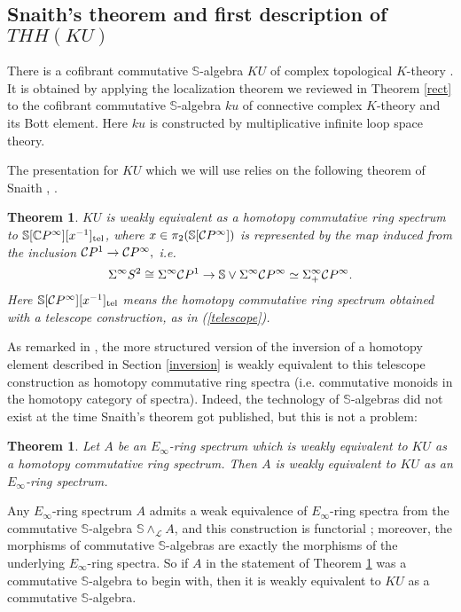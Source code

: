 \documentclass[a4paper,11pt]{amsart} %
\theoremstyle{definition} \newtheorem{defn}[equation]{Definition}
\theoremstyle{remark} \newtheorem{notation}[equation]{Notation}
\theoremstyle{plain} \newtheorem{teo}[equation]{Theorem}
\theoremstyle{plain} \newtheorem{lema}[equation]{Lemma}
\theoremstyle{plain} \newtheorem{prop}[equation]{Proposition}
\theoremstyle{plain} \newtheorem{corolario}[equation]{Corollary}
\theoremstyle{remark} \newtheorem{obs}[equation]{Remark}
\theoremstyle{remark} \newtheorem{sideobs}[equation]{Side remark}
\theoremstyle{remark} \newtheorem{ejercicio}[equation]{Exercise}
\theoremstyle{definition} \newtheorem{notn}[equation]{Notation}
\theoremstyle{remark} \newtheorem{ej}[equation]{Example}
\theoremstyle{remark} \newtheorem{contraej}[equation]{Counterexample}
\theoremstyle{plain} \newtheorem{conj}[equation]{Conjecture}
\renewcommand{\L}{\mathcal{L}}
\renewcommand{\1}{\ensuremath{\mathbbm{1}}}
\renewcommand{\S}{\mathbb{S}}
\newcommand{\bteo}{\begin{teo}}
\newcommand{\eteo}{\end{teo}}
\newcommand{\sip}{\Sigma^\infty_+}
\numberwithin{equation}{section}
\renewcommand{\L}{\mathcal{L}}
\begin{document}
%
%
%
%
%
%
%
%



\subsection{Snaith's theorem and first description of $THH(KU)$} \label{construction-ku}  

There is a cofibrant commutative $\S$-algebra $KU$ of complex topological $K$-theory \cite[VIII.4.3]{ekmm}. It is obtained by applying the localization theorem we reviewed in Theorem \ref{rect} to the cofibrant commutative $\S$-algebra $ku$ of connective complex $K$-theory and its Bott element. Here $ku$ is constructed by multiplicative infinite loop space theory.

The presentation for $KU$ which we will use relies on the following theorem of Snaith \cite{snaith79}, \cite{snaith81}. %

\bteo $KU$ is weakly equivalent as a homotopy commutative ring spectrum to \linebreak $\S[\mathbb C P^\infty][x^{-1}]_{\textup{tel}}$, where $x\in \pi_2(\S[\C P^\infty])$ is represented by the map induced from the inclusion $\mathcal{C} P^1\to \mathcal{C} P^\infty,$ i.e.
\begin{equation}\label{xproj} \Sigma^\infty S^2\cong \Sigma^\infty \C P^1 \to \S \vee \Sigma^\infty \C P^\infty \simeq \sip \C P^\infty. \end{equation}
Here $\S[\C P^\infty][x^{-1}]_{\textup{tel}}$ means the homotopy commutative ring spectrum obtained with a telescope construction, as in (\ref{telescope}).
\eteo

As remarked in \cite[VIII.4]{ekmm}, the more structured version of the inversion of a homotopy element described in Section \ref{inversion} is weakly equivalent to this telescope construction as homotopy commutative ring spectra (i.e. commutative monoids in the homotopy category of spectra). %
Indeed, the technology of $\S$-algebras did not exist at the time Snaith's theorem got published, but this is not a problem:

\bteo \label{bari} \cite[6.2]{baker-richter} Let $A$ be an $E_\infty$-ring spectrum which is weakly equivalent to $KU$ as a homotopy commutative ring spectrum. Then $A$ is weakly equivalent to $KU$ as an $E_\infty$-ring spectrum.
\eteo

Any $E_\infty$-ring spectrum $A$ admits a weak equivalence of $E_\infty$-ring spectra from the commutative $\S$-algebra $\S\wedge_\L A$, and this construction is functorial \cite[II.3.6]{ekmm}; moreover, the morphisms of commutative $\S$-algebras are exactly the morphisms of the underlying $E_\infty$-ring spectra. So if $A$ in the statement of Theorem \ref{bari} was a commutative $\S$-algebra to begin with, then it is weakly equivalent to $KU$ as a commutative $\S$-algebra. %
\end{document}
